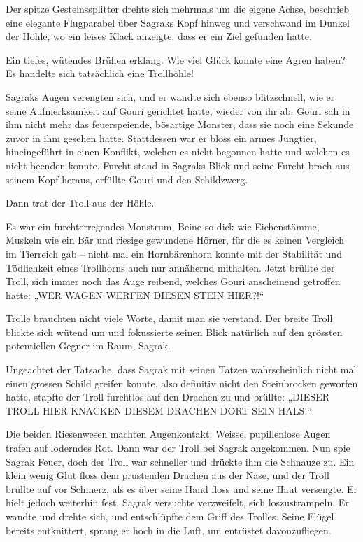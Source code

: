 Der spitze Gesteinssplitter drehte sich mehrmals um die eigene Achse, beschrieb eine elegante Flugparabel über Sagraks Kopf hinweg und verschwand im Dunkel der Höhle, wo ein leises Klack anzeigte, dass er ein Ziel gefunden hatte.

Ein tiefes, wütendes Brüllen erklang. Wie viel Glück konnte eine Agren haben? Es handelte sich tatsächlich eine Trollhöhle!

Sagraks Augen verengten sich, und er wandte sich ebenso blitzschnell, wie er seine Aufmerksamkeit auf Gouri gerichtet hatte, wieder von ihr ab. Gouri sah in ihm nicht mehr das feuerspeiende, bösartige Monster, dass sie noch eine Sekunde zuvor in ihm gesehen hatte. Stattdessen war er bloss ein armes Jungtier, hineingeführt in einen Konflikt, welchen es nicht begonnen hatte und welchen es nicht beenden konnte. Furcht stand in Sagraks Blick und seine Furcht brach aus seinem Kopf heraus, erfüllte Gouri und den Schildzwerg.

Dann trat der Troll aus der Höhle.

Es war ein furchterregendes Monstrum, Beine so dick wie Eichenstämme, Muskeln wie ein Bär und riesige gewundene Hörner, für die es keinen Vergleich im Tierreich gab – nicht mal ein Hornbärenhorn konnte mit der Stabilität und Tödlichkeit eines Trollhorns auch nur annähernd mithalten. Jetzt brüllte der Troll, sich immer noch das Auge reibend, welches Gouri anscheinend getroffen hatte: „WER WAGEN WERFEN DIESEN STEIN HIER?!“

Trolle brauchten nicht viele Worte, damit man sie verstand. Der breite Troll blickte sich wütend um und fokussierte seinen Blick natürlich auf den grössten potentiellen Gegner im Raum, Sagrak.

Ungeachtet der Tatsache, dass Sagrak mit seinen Tatzen wahrscheinlich nicht mal einen grossen Schild greifen konnte, also definitiv nicht den Steinbrocken geworfen hatte, stapfte der Troll furchtlos auf den Drachen zu und brüllte: „DIESER TROLL HIER KNACKEN DIESEM DRACHEN DORT SEIN HALS!“

Die beiden Riesenwesen machten Augenkontakt. Weisse, pupillenlose Augen trafen auf loderndes Rot. Dann war der Troll bei Sagrak angekommen. Nun spie Sagrak Feuer, doch der Troll war schneller und drückte ihm die Schnauze zu. Ein klein wenig Glut floss dem prustenden Drachen aus der Nase, und der Troll brüllte auf vor Schmerz, als es über seine Hand floss und seine Haut versengte. Er hielt jedoch weiterhin fest. Sagrak versuchte verzweifelt, sich loszustrampeln. Er wandte und drehte sich, und entschlüpfte dem Griff des Trolles. Seine Flügel bereits entknittert, sprang er hoch in die Luft, um entrüstet davonzufliegen.


